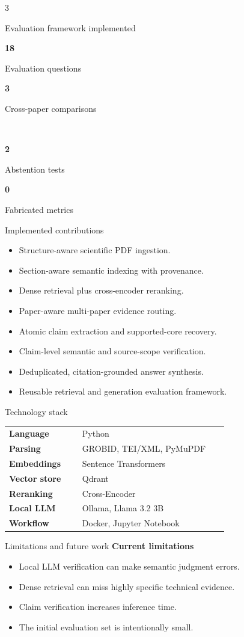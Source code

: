\documentclass[a0,portrait]{a0poster}
\newcommand{\metric}[2]{%
  \begin{minipage}[c]{0.47\linewidth}\centering
  {\color{PosterBlue}\bfseries\LARGE #1}\par
  {\large #2}
  \end{minipage}}
\begin{document}
\begin{multicols}{3}
\begin{posterbox}{Evaluation framework implemented}
\begin{center}
\metric{18}{Evaluation questions}\hfill
\metric{3}{Cross-paper comparisons}\\[5mm]
\metric{2}{Abstention tests}\hfill
\metric{0}{Fabricated metrics}
\end{center}
\end{posterbox}

\begin{posterbox}{Implemented contributions}
\begin{itemize}
  \item Structure-aware scientific PDF ingestion.
  \item Section-aware semantic indexing with provenance.
  \item Dense retrieval plus cross-encoder reranking.
  \item Paper-aware multi-paper evidence routing.
  \item Atomic claim extraction and supported-core recovery.
  \item Claim-level semantic and source-scope verification.
  \item Deduplicated, citation-grounded answer synthesis.
  \item Reusable retrieval and generation evaluation framework.
\end{itemize}
\end{posterbox}

\begin{posterbox}{Technology stack}
\begin{center}
\renewcommand{\arraystretch}{1.45}
\begin{tabular}{p{0.30\linewidth}p{0.60\linewidth}}
\textbf{Language} & Python \\
\textbf{Parsing} & GROBID, TEI/XML, PyMuPDF \\
\textbf{Embeddings} & Sentence Transformers \\
\textbf{Vector store} & Qdrant \\
\textbf{Reranking} & Cross-Encoder \\
\textbf{Local LLM} & Ollama, Llama 3.2 3B \\
\textbf{Workflow} & Docker, Jupyter Notebook \\
\end{tabular}
\end{center}
\end{posterbox}

\begin{posterbox}{Limitations and future work}
\textbf{Current limitations}
\begin{itemize}
  \item Local LLM verification can make semantic judgment errors.
  \item Dense retrieval can miss highly specific technical evidence.
  \item Claim verification increases inference time.
  \item The initial evaluation set is intentionally small.
\end{itemize}


\end{posterbox}
\end{multicols}
\end{document}
